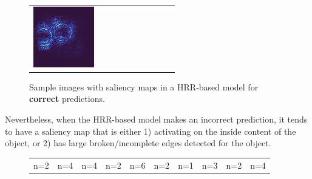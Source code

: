\documentclass[letterpaper]{article} %
\begin{document}
\begin{figure}[!htbp]
\begin{tabular}{cccccccccc}
\multicolumn{1}{c}{\includegraphics[width=0.07\columnwidth]{figures/appendix/hrr/true/95_slc.jpg}} \hspace{-11pt}
\end{tabular}
\caption{Sample images with saliency maps in a HRR-based model for \textbf{correct} predictions.}
\label{fig:hrr_true}
\end{figure}

Nevertheless, when the HRR-based model makes an incorrect prediction, it tends to have a saliency map that is either 1) activating on the inside content of the object, or 2) has large broken/incomplete edges detected for the object.

\begin{figure}[!htbp]
\centering
\vspace{-2pt}
\footnotesize 
\begin{tabular}{cccccccccc}
\multicolumn{1}{c}{n=2} \hspace{-11pt} &  
\multicolumn{1}{c}{n=4} \hspace{-11pt} & 
\multicolumn{1}{c}{n=4} \hspace{-11pt} & 
\multicolumn{1}{c}{n=2} \hspace{-11pt} & 
\multicolumn{1}{c}{n=6} \hspace{-11pt} & 
\multicolumn{1}{c}{n=2} \hspace{-11pt} & 
\multicolumn{1}{c}{n=1} \hspace{-11pt} &  
\multicolumn{1}{c}{n=3} \hspace{-11pt} & 
\multicolumn{1}{c}{n=2} \hspace{-11pt} & 
\multicolumn{1}{c}{n=4} \\ 


\end{tabular}
\end{figure}
\end{document}
